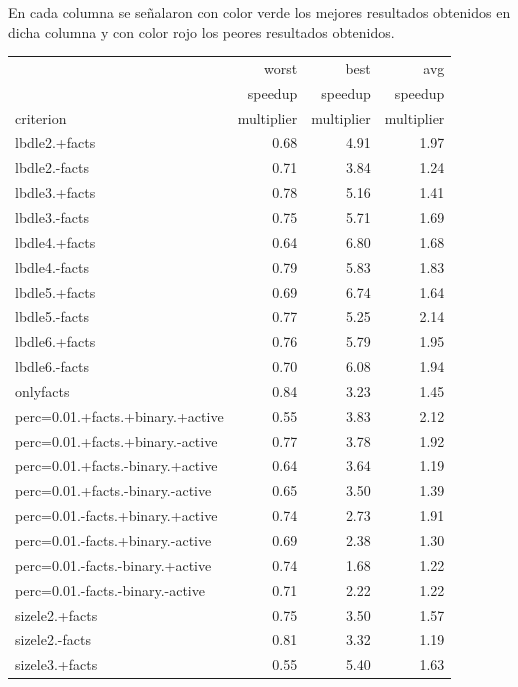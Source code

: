 En cada columna se señalaron con color verde los mejores resultados obtenidos
en dicha columna y con color rojo los peores resultados obtenidos.

\begin{table}
	\small
	\begin{tabular}{lrrr}
		\toprule
					&	worst 		&	best		&	avg \\
					&	 \phantom{(x)} speedup		&	\phantom{(x)} speedup		&	\phantom{(x)} speedup \\
		criterion	&	multiplier	&	multiplier	&	multiplier \\
		\cmidrule(r){1-4}
		lbdle2.+facts	&	0.68	&	4.91	&	1.97 \\
		lbdle2.-facts	&	0.71	&	3.84	&	1.24 \\
		lbdle3.+facts	&	0.78	&	5.16	&	1.41 \\
		lbdle3.-facts	&	0.75	&	5.71	&	1.69 \\
		lbdle4.+facts	&	0.64	&	6.80	&	1.68 \\
		lbdle4.-facts	&	0.79	&	5.83	&	1.83 \\
		lbdle5.+facts	&	0.69	&	6.74	&	1.64 \\
		lbdle5.-facts	&	0.77	&	5.25	&	2.14 \\
		lbdle6.+facts	&	0.76	&	5.79	&	1.95 \\
		lbdle6.-facts	&	0.70	&	6.08	&	1.94 \\
		\cmidrule(r){1-4}
		onlyfacts	&	\cellcolor{green}0.84	&	3.23	&	1.45 \\
		\cmidrule(r){1-4}
		perc=0.01.+facts.+binary.+active	&	\cellcolor{red}0.55	&	3.83	&	2.12 \\
		perc=0.01.+facts.+binary.-active	&	0.77	&	3.78	&	1.92 \\
		perc=0.01.+facts.-binary.+active	&	0.64	&	3.64	&	\cellcolor{red}1.19 \\
		perc=0.01.+facts.-binary.-active	&	0.65	&	3.50	&	1.39 \\
		perc=0.01.-facts.+binary.+active	&	0.74	&	2.73	&	1.91 \\
		perc=0.01.-facts.+binary.-active	&	0.69	&	2.38	&	1.30 \\
		perc=0.01.-facts.-binary.+active	&	0.74	&	\cellcolor{red}1.68	&	1.22 \\
		perc=0.01.-facts.-binary.-active	&	0.71	&	2.22	&	1.22 \\
		\cmidrule(r){1-4}
		sizele2.+facts	&	0.75	&	3.50	&	1.57 \\
		sizele2.-facts	&	0.81	&	3.32	&	\cellcolor{red}1.19 \\
		sizele3.+facts	&	\cellcolor{red}0.55	&	5.40	&	1.63 \\

\end{tabular}
\end{table}

